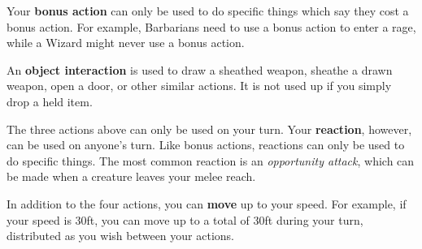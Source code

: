 \documentclass[letterpaper,twocolumn,openany,nodeprecatedcode,bg=print]{dndbook}
\begin{document}
Your \textbf{bonus action} can only be used to do specific things which say they cost a bonus action. For example, Barbarians need to use a bonus action to enter a rage, while a Wizard might never use a bonus action.

An \textbf{object interaction} is used to draw a sheathed weapon, sheathe a drawn weapon, open a door, or other similar actions. It is not used up if you simply drop a held item.

The three actions above can only be used on your turn. Your \textbf{reaction}, however, can be used on anyone's turn. Like bonus actions, reactions can only be used to do specific things. The most common reaction is an \textit{opportunity attack}, which can be made when a creature leaves your melee reach.

In addition to the four actions, you can \textbf{move} up to your speed. For example, if your speed is 30ft, you can move up to a total of 30ft during your turn, distributed as you wish between your actions.
\end{document}
